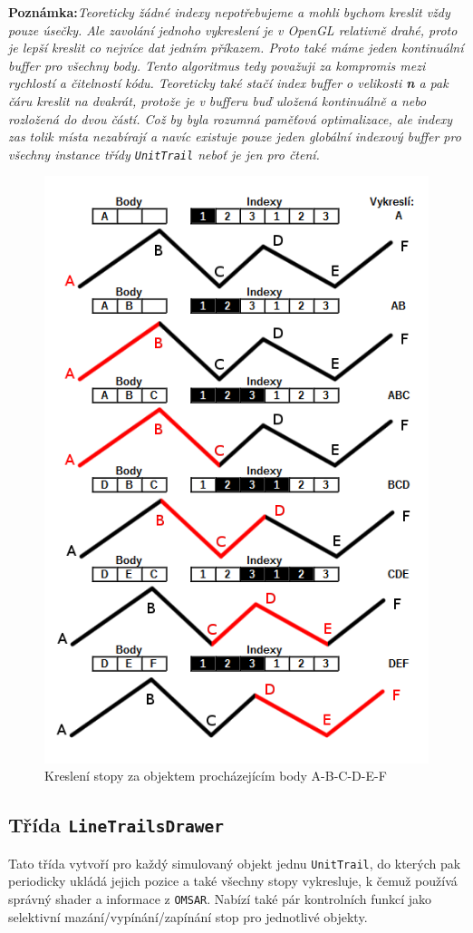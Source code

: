 \textbf{Poznámka:}\textit{Teoreticky žádné indexy nepotřebujeme a mohli bychom kreslit vždy pouze úsečky. Ale zavolání jednoho vykreslení je v OpenGL relativně drahé, proto je lepší kreslit co nejvíce dat jedním příkazem. Proto také máme jeden kontinuální buffer pro všechny body. Tento algoritmus tedy považuji za kompromis mezi rychlostí a čitelností kódu. Teoreticky také stačí index buffer o velikosti \textbf{n} a pak čáru kreslit na dvakrát, protože je v bufferu buď uložená kontinuálně a nebo rozložená do dvou částí. Což by byla rozumná paměťová optimalizace, ale indexy zas tolik místa nezabírají a navíc existuje pouze jeden globální indexový buffer pro všechny instance třídy \texttt{UnitTrail} neboť je jen pro čtení.}
\begin{figure}
	\caption{Kreslení stopy za objektem procházejícím body A-B-C-D-E-F}
	\label{fig:lineTrail} 
	\centering
	\includegraphics[width=0.5\linewidth]{Figs/LineTrail}
\end{figure}
\subsection{Třída \texttt{LineTrailsDrawer}}
Tato třída vytvoří pro každý simulovaný objekt jednu \texttt{UnitTrail}, do kterých pak periodicky ukládá jejich pozice a také všechny stopy vykresluje, k čemuž používá správný shader a informace z \texttt{OMSAR}. Nabízí také pár kontrolních funkcí jako selektivní mazání/vypínání/zapínání stop pro jednotlivé objekty.

